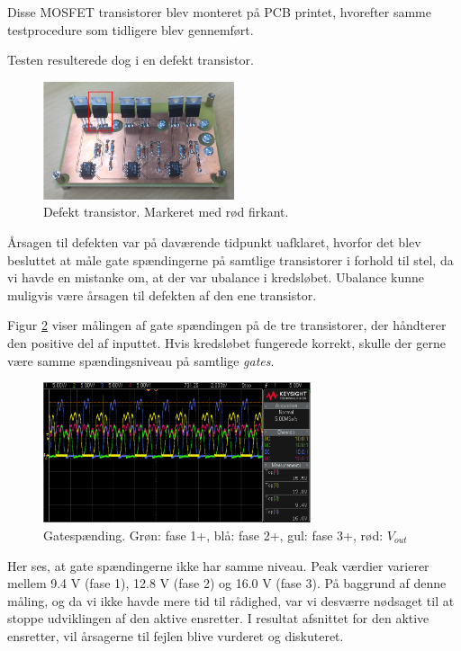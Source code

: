 Disse MOSFET transistorer blev monteret på PCB printet, hvorefter samme testprocedure som tidligere blev gennemført.  

Testen resulterede dog i en defekt transistor.

\begin{figure}[h]
  \centering
  \includegraphics[width=0.5\textwidth]{./figurer/nt8.png}
  \caption{Defekt transistor. Markeret med rød firkant.}
  \label{fig:nt8}
\end{figure}

Årsagen til defekten var på daværende tidpunkt uafklaret, hvorfor det blev besluttet at måle gate spændingerne på samtlige transistorer i forhold til stel, da vi havde en mistanke om, at der var ubalance i kredsløbet. Ubalance kunne muligvis være årsagen til defekten af den ene transistor. 

Figur \ref{fig:nt9} viser målingen af gate spændingen på de tre transistorer, der håndterer den positive del af inputtet. Hvis kredsløbet fungerede korrekt, skulle der gerne være samme spændingsniveau på samtlige \textit{gates}. 

\begin{figure}[h]
  \centering
  \includegraphics[width=0.7\textwidth]{./figurer/nt9.png}
  \caption{Gatespænding. Grøn: fase 1+, blå: fase 2+, gul: fase 3+, rød: $V_{out}$}
  \label{fig:nt9}
\end{figure}

Her ses, at gate spændingerne ikke har samme niveau. Peak værdier varierer mellem 9.4 V (fase 1), 12.8 V (fase 2) og 16.0 V (fase 3). På baggrund af denne måling, og da vi ikke havde mere tid til rådighed, var vi desværre nødsaget til at stoppe udviklingen af den aktive ensretter. I resultat afsnittet for den aktive ensretter, vil årsagerne til fejlen blive vurderet og diskuteret. 


